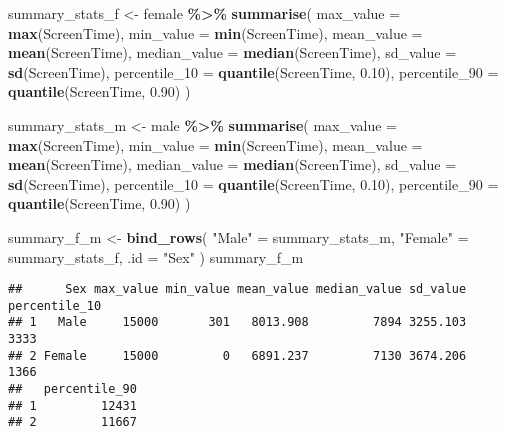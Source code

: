 \documentclass[
]{book}
\newenvironment{Shaded}{\begin{snugshade}}{\end{snugshade}}
\newcommand{\AttributeTok}[1]{\textcolor[rgb]{0.13,0.29,0.53}{#1}}
\newcommand{\FloatTok}[1]{\textcolor[rgb]{0.00,0.00,0.81}{#1}}
\newcommand{\FunctionTok}[1]{\textcolor[rgb]{0.13,0.29,0.53}{\textbf{#1}}}
\newcommand{\NormalTok}[1]{#1}
\newcommand{\OtherTok}[1]{\textcolor[rgb]{0.56,0.35,0.01}{#1}}
\newcommand{\SpecialCharTok}[1]{\textcolor[rgb]{0.81,0.36,0.00}{\textbf{#1}}}
\newcommand{\StringTok}[1]{\textcolor[rgb]{0.31,0.60,0.02}{#1}}
\begin{document}
\begin{Shaded}
\begin{Highlighting}[]
\NormalTok{summary\_stats\_f }\OtherTok{\textless{}{-}}\NormalTok{ female }\SpecialCharTok{\%\textgreater{}\%}
  \FunctionTok{summarise}\NormalTok{(}
    \AttributeTok{max\_value =} \FunctionTok{max}\NormalTok{(ScreenTime),}
    \AttributeTok{min\_value =} \FunctionTok{min}\NormalTok{(ScreenTime),}
    \AttributeTok{mean\_value =} \FunctionTok{mean}\NormalTok{(ScreenTime),}
    \AttributeTok{median\_value =} \FunctionTok{median}\NormalTok{(ScreenTime),}
    \AttributeTok{sd\_value =} \FunctionTok{sd}\NormalTok{(ScreenTime),}
    \AttributeTok{percentile\_10 =} \FunctionTok{quantile}\NormalTok{(ScreenTime, }\FloatTok{0.10}\NormalTok{),}
    \AttributeTok{percentile\_90 =} \FunctionTok{quantile}\NormalTok{(ScreenTime, }\FloatTok{0.90}\NormalTok{)}
\NormalTok{  )}



\NormalTok{summary\_stats\_m }\OtherTok{\textless{}{-}}\NormalTok{ male }\SpecialCharTok{\%\textgreater{}\%}
  \FunctionTok{summarise}\NormalTok{(}
    \AttributeTok{max\_value =} \FunctionTok{max}\NormalTok{(ScreenTime),}
    \AttributeTok{min\_value =} \FunctionTok{min}\NormalTok{(ScreenTime),}
    \AttributeTok{mean\_value =} \FunctionTok{mean}\NormalTok{(ScreenTime),}
    \AttributeTok{median\_value =} \FunctionTok{median}\NormalTok{(ScreenTime),}
    \AttributeTok{sd\_value =} \FunctionTok{sd}\NormalTok{(ScreenTime),}
    \AttributeTok{percentile\_10 =} \FunctionTok{quantile}\NormalTok{(ScreenTime, }\FloatTok{0.10}\NormalTok{),}
    \AttributeTok{percentile\_90 =} \FunctionTok{quantile}\NormalTok{(ScreenTime, }\FloatTok{0.90}\NormalTok{)}
\NormalTok{  )}



\NormalTok{summary\_f\_m }\OtherTok{\textless{}{-}} \FunctionTok{bind\_rows}\NormalTok{(}
  \StringTok{"Male"} \OtherTok{=}\NormalTok{ summary\_stats\_m, }
  \StringTok{"Female"} \OtherTok{=}\NormalTok{ summary\_stats\_f, }
  \AttributeTok{.id =} \StringTok{"Sex"}
\NormalTok{)}
\NormalTok{summary\_f\_m}
\end{Highlighting}
\end{Shaded}

\begin{verbatim}
##      Sex max_value min_value mean_value median_value sd_value percentile_10
## 1   Male     15000       301   8013.908         7894 3255.103          3333
## 2 Female     15000         0   6891.237         7130 3674.206          1366
##   percentile_90
## 1         12431
## 2         11667
\end{verbatim}
\end{document}
